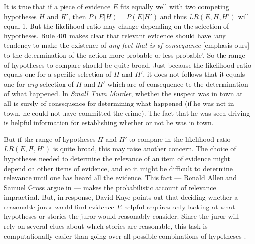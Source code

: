 \documentclass{article}
\begin{document}



It is true that if a piece of evidence $E$ fits equally well with two competing hypotheses  $H$ and $H'$,  then $P(E\vert H)=P(E\vert H')$ and thus $LR(E,H,H')$ will equal 1. But the likelihood ratio may change depending on the selection of hypotheses. Rule 401 makes clear that relevant 
evidence should have `any tendency to make the existence of \emph{any fact that is of consequence} [emphasis ours] to the determination of the action more probable or less probable'. So the range of hypotheses to compare should be quite broad. Just because the likelihood ratio equals one for a specific selection of $H$ and $H'$, it does not follows that it equals one for \textit{any} selection of $H$ and $H'$ which are of consequence to the determination of what happened.  In \textit{Small Town Murder}, whether the suspect was in town at all is surely of consequence for determining what happened  (if he was not in town, he could not have committed the crime). The fact that he was seen driving is helpful information for establishing whether or not he was in town.  

But if the range of  hypotheses $H$ and $H'$ to compare in the likelihood ratio $LR(E, H, H')$ is quite broad, 
this may raise another concern. The choice of hypotheses  needed to determine the relevance of an  item of evidence might depend on other items of evidence, and so it might be  difficult to determine relevance until one has heard all the evidence.  This fact --- Ronald Allen and Samuel Gross argue in \citep{park2010BayesWarsRedivivus} ---  makes the probabilistic account of relevance impractical.  But, in response, David Kaye points out that deciding whether a reasonable juror would find  evidence $E$  helpful requires only looking at what hypotheses or stories the juror would reasonably consider. Since the juror will rely on several clues about which stories are reasonable, this task is computationally easier than going over all possible combinations of  hypotheses \citep{park2010BayesWarsRedivivus}. 
\end{document}
